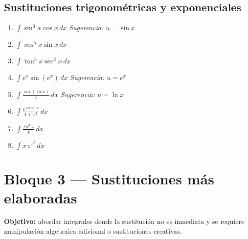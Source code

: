 \documentclass[12pt, letterpaper]{article}
\newcommand{\dx}{\,dx}
\begin{document}
\subsection{Sustituciones trigonométricas y exponenciales}

\begin{enumerate}[label=\textbf{\arabic*.}, leftmargin=*, itemsep=12pt, start=29]

  \item \medio\quad
    $\displaystyle\int \sin^3 x \cos x \dx$
    \qquad\textit{Sugerencia: $u = \sin x$}

  \item \medio\quad
    $\displaystyle\int \cos^5 x \sin x \dx$

  \item \medio\quad
    $\displaystyle\int \tan^3 x \sec^2 x \dx$

  \item \medio\quad
    $\displaystyle\int e^x\sin(e^x)\dx$
    \qquad\textit{Sugerencia: $u = e^x$}

  \item \dificil\quad
    $\displaystyle\int \frac{\sin(\ln x)}{x}\dx$
    \qquad\textit{Sugerencia: $u = \ln x$}

  \item \dificil\quad
    $\displaystyle\int \frac{e^{\arctan x}}{1+x^2}\dx$

  \item \dificil\quad
    $\displaystyle\int \frac{\ln^3 x}{x}\dx$

  \item \dificil\quad
    $\displaystyle\int x\,e^{x^2}\dx$

\end{enumerate}

\vspace{4pt}

\section{Bloque 3 — Sustituciones más elaboradas}

\begin{cuadroinfo}
\small\textbf{Objetivo:} abordar integrales donde la sustitución no es inmediata
y se requiere manipulación algebraica adicional o sustituciones creativas.
\end{cuadroinfo}
\end{document}
